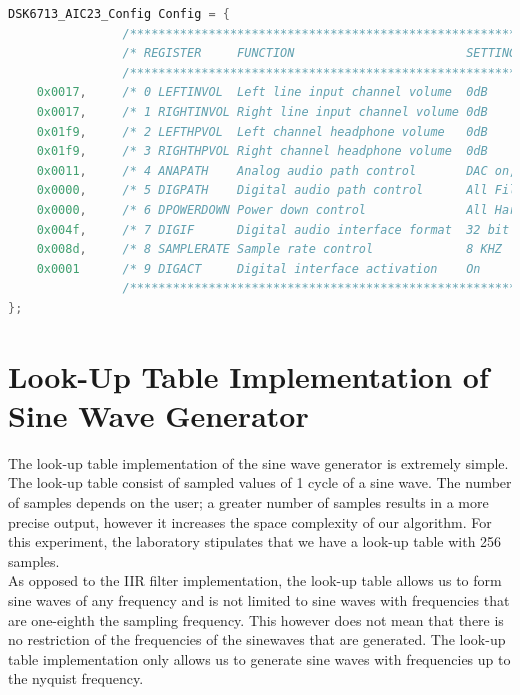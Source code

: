 \documentclass{article}
\begin{document}
\begin{lstlisting}[language=C, frame=single, caption=Hardware Initialisation Settings]
DSK6713_AIC23_Config Config = {
                /**********************************************************************/
                /* REGISTER     FUNCTION                        SETTINGS              */ 
                /**********************************************************************/
    0x0017,     /* 0 LEFTINVOL  Left line input channel volume  0dB                   */
    0x0017,     /* 1 RIGHTINVOL Right line input channel volume 0dB                   */
    0x01f9,     /* 2 LEFTHPVOL  Left channel headphone volume   0dB                   */
    0x01f9,     /* 3 RIGHTHPVOL Right channel headphone volume  0dB                   */
    0x0011,     /* 4 ANAPATH    Analog audio path control       DAC on, Mic boost 20dB*/
    0x0000,     /* 5 DIGPATH    Digital audio path control      All Filters off       */
    0x0000,     /* 6 DPOWERDOWN Power down control              All Hardware on       */
    0x004f,     /* 7 DIGIF      Digital audio interface format  32 bit                */
    0x008d,     /* 8 SAMPLERATE Sample rate control             8 KHZ                 */
    0x0001      /* 9 DIGACT     Digital interface activation    On                    */
                /**********************************************************************/
};
\end{lstlisting}


\section{Look-Up Table Implementation of Sine Wave Generator}


The look-up table implementation of the sine wave generator is extremely simple. The look-up table consist of sampled values of 1 cycle of a sine wave. The number of samples depends on the user; a greater number of samples results in a more precise output, however it increases the space complexity of our algorithm. For this experiment, the laboratory stipulates that we have a look-up table with 256 samples. \\


As opposed to the IIR filter implementation, the look-up table allows us to form sine waves of any frequency and is not limited to sine waves with frequencies that are one-eighth the sampling frequency. This however does not mean that there is no restriction of the frequencies of the sinewaves that are generated. The look-up table implementation only allows us to generate sine waves with frequencies up to the nyquist frequency.\\ 
\end{document}
